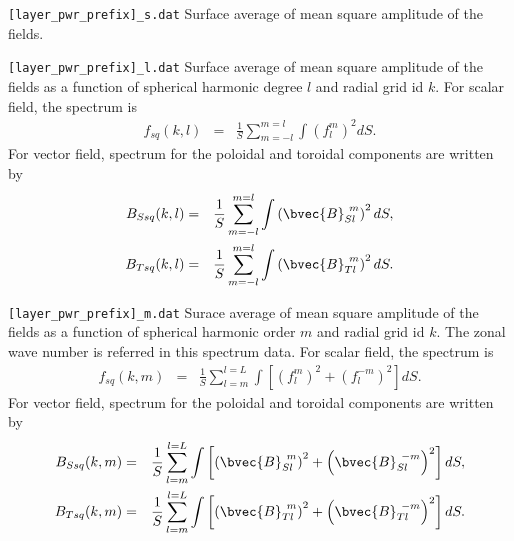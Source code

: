 \begin{description}
\item{\tt [layer\_pwr\_prefix]\_s.dat} Surface average of mean square amplitude of the fields.
\item{\tt [layer\_pwr\_prefix]\_l.dat} Surface average of mean square amplitude of the fields as a function of spherical harmonic degree $l$ and radial grid id $k$. For scalar field, the spectrum is
\begin{eqnarray}
f_{sq}(k,l) &=& \frac{1}{S} \sum_{m=-l}^{m=l} \int \left({f_{l}^{m}} \right)^{2} dS.
\nonumber
\end{eqnarray}
For vector field, spectrum for the poloidal and toroidal components are written by 
\begin{eqnarray}
B_{Ssq}(k,l) &=& \frac{1}{S} \sum_{m=-l}^{m=l} \int \left(\bvec{B}_{Sl}^{\ m} \right)^{2} dS,
\nonumber \\
B_{Tsq}(k,l) &=& \frac{1}{S} \sum_{m=-l}^{m=l} \int \left(\bvec{B}_{Tl}^{\ m} \right)^{2} dS.
\nonumber
\end{eqnarray}

\item{\tt [layer\_pwr\_prefix]\_m.dat} Surace average of mean square amplitude of the fields as a function of spherical harmonic order $m$ and radial grid id $k$. The zonal wave number is referred in this spectrum data. For scalar field, the spectrum is
\begin{eqnarray}
f_{sq}(k,m) &=& \frac{1}{S} \sum_{l=m}^{l=L} \int \left[ \left(f_{l}^{m} \right)^{2}
 + \left( f_{l}^{-m} \right)^{2} \right] dS.
\nonumber
\end{eqnarray}
For vector field, spectrum for the poloidal and toroidal components are written by 
\begin{eqnarray}
B_{Ssq}(k,m) &=& \frac{1}{S} \sum_{l=m}^{l=L} \int \left[\left(\bvec{B}_{Sl}^{\ m} \right)^{2} 
 + \left(\bvec{B}_{Sl}^{\ -m} \right)^{2}  \right] dS,
\nonumber \\
B_{Tsq}(k,m) &=& \frac{1}{S} \sum_{l=m}^{l=L} \int \left[\left(\bvec{B}_{Tl}^{\ m} \right)^{2} 
 + \left(\bvec{B}_{Tl}^{\ -m} \right)^{2}  \right] dS.
\nonumber
\end{eqnarray}


\end{description}
